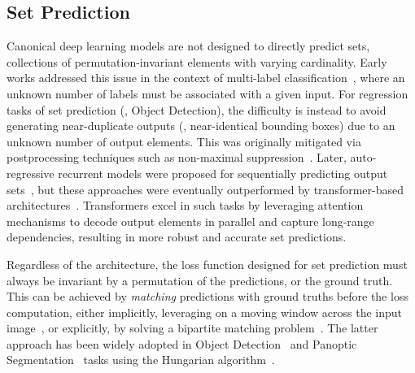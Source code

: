 \subsection{Set Prediction}
Canonical deep learning models are not designed to directly predict sets, \ie collections of permutation-invariant elements with varying cardinality.
%
Early works addressed this issue in the context of multi-label classification~\cite{rezatofighi2017deepsetnet}, where an unknown number of labels must be associated with a given input. 
For regression tasks of set prediction (\eg, Object Detection), the difficulty is instead to avoid generating near-duplicate outputs (\ie, near-identical bounding boxes) due to an unknown number of output elements.
%
This was originally mitigated via postprocessing techniques such as non-maximal suppression~\cite{erhan2014scalable,redmon2016yolo}. 
Later, auto-regressive recurrent models were proposed for sequentially predicting output sets~\cite{vinyalsseqtoseq,stewart2016end}, but these approaches were eventually outperformed by transformer-based architectures~\cite{carion2020detr,cheng2021maskformer}.
Transformers excel in such tasks by leveraging attention mechanisms to decode output elements in parallel and capture long-range dependencies, resulting in more robust and accurate set predictions.

Regardless of the architecture, the loss function designed for set prediction must always be invariant by a permutation of the predictions, or the ground truth.
This can be achieved by \emph{matching} predictions with ground truths before the loss computation, either implicitly, leveraging on a moving window across the input image~\cite{redmon2016yolo}, or explicitly, by solving a bipartite matching problem~\cite{erhan2014scalable,stewart2016end,cheng2021maskformer}.
The latter approach has been widely adopted in Object Detection~\cite{carion2020detr} and Panoptic Segmentation~\cite{cheng2021maskformer} tasks using the Hungarian algorithm~\cite{kuhn1955hungarian}.

